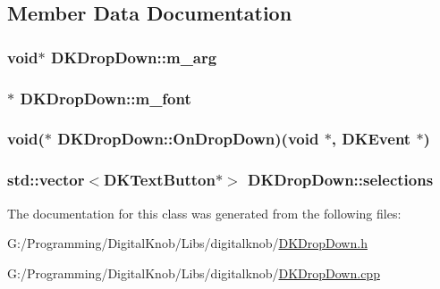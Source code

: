 \subsection{Member Data Documentation}
\hypertarget{class_d_k_drop_down_a5df92d09ed2a3bfbb3d1b692a31cc9d3}{
\subsubsection[{m\-\_\-arg}]{\setlength{\rightskip}{0pt plus 5cm}void$\ast$ D\-K\-Drop\-Down\-::m\-\_\-arg}}\label{class_d_k_drop_down_a5df92d09ed2a3bfbb3d1b692a31cc9d3}
\hypertarget{class_d_k_drop_down_af6406055b8fa794eb2410b7a49eb025c}{
\subsubsection[{m\-\_\-font}]{$\ast$ D\-K\-Drop\-Down\-::m\-\_\-font}}\label{class_d_k_drop_down_af6406055b8fa794eb2410b7a49eb025c}
\hypertarget{class_d_k_drop_down_a08a4e1985d4876815f4c9e6c6f869157}{
\subsubsection[{On\-Drop\-Down}]{\setlength{\rightskip}{0pt plus 5cm}void($\ast$ D\-K\-Drop\-Down\-::\-On\-Drop\-Down)(void $\ast$, {\bf D\-K\-Event} $\ast$)}}\label{class_d_k_drop_down_a08a4e1985d4876815f4c9e6c6f869157}
\hypertarget{class_d_k_drop_down_a3d2050f7629f66e0a815b9cac5f1d4e6}{
\subsubsection[{selections}]{\setlength{\rightskip}{0pt plus 5cm}std\-::vector$<${\bf D\-K\-Text\-Button}$\ast$$>$ D\-K\-Drop\-Down\-::selections}}\label{class_d_k_drop_down_a3d2050f7629f66e0a815b9cac5f1d4e6}


The documentation for this class was generated from the following files\-:\begin{DoxyCompactItemize}
\item 
G\-:/\-Programming/\-Digital\-Knob/\-Libs/digitalknob/\hyperlink{_d_k_drop_down_8h}{D\-K\-Drop\-Down.\-h}\item 
G\-:/\-Programming/\-Digital\-Knob/\-Libs/digitalknob/\hyperlink{_d_k_drop_down_8cpp}{D\-K\-Drop\-Down.\-cpp}\end{DoxyCompactItemize}
